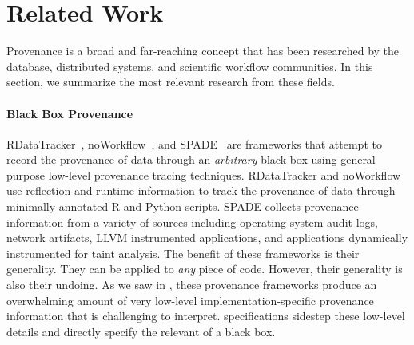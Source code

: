 \section{Related Work}
Provenance is a broad and far-reaching concept that has been researched by the
database, distributed systems, and scientific workflow communities. In this
section, we summarize the most relevant research from these fields.

\paragraph{Black Box Provenance}
RDataTracker~\cite{lerner2014collecting},
noWorkflow~\cite{murta2014noworkflow}, and SPADE~\cite{gehani2012spade} are
frameworks that attempt to record the provenance of data through an
\emph{arbitrary} black box using general purpose low-level provenance
tracing techniques. RDataTracker and noWorkflow use reflection and runtime
information to track the provenance of data through minimally annotated R and
Python scripts. SPADE collects provenance information from a variety of sources
including operating system audit logs, network artifacts, LLVM instrumented
applications, and applications dynamically instrumented for taint analysis. The
benefit of these frameworks is their generality. They can be applied to
\emph{any} piece of code. However, their generality is also their undoing. As
we saw in , these provenance frameworks produce an
overwhelming amount of very low-level implementation-specific provenance
information that is challenging to interpret. \watprovenance{} specifications
sidestep these low-level details and directly specify the relevant
\watprovenance{} of a black box.

